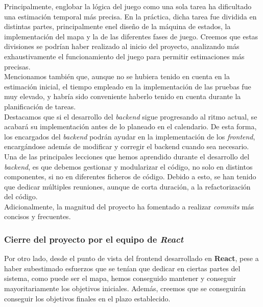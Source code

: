 \documentclass[11pt, a4paper, titlepage]{article}
\begin{document}
Principalmente, englobar la lógica del juego como una sola tarea ha dificultado una estimación temporal más precisa. En la práctica, dicha tarea fue dividida en distintas partes, principalmente enel diseño de la máquina de estados, la implementación del mapa y la de las diferentes fases de juego. Creemos que estas divisiones se podrían haber realizado al inicio del proyecto, analizando más exhaustivamente el funcionamiento del juego para permitir estimaciones más precisas. \\

Mencionamos también que, aunque no se hubiera tenido en cuenta en la estimación inicial, el tiempo empleado en la implementación de las pruebas fue muy elevado, y habría sido conveniente haberlo tenido en cuenta durante la planificación de tareas. \\

Destacamos que si el desarrollo del \textit{backend} sigue progresando al ritmo actual, se acabará su implementación antes de lo planeado en el calendario. De esta forma, los encargados del \textit{backend} podrán ayudar en la implementación de los \textit{frontend}, encargándose además de modificar y corregir el backend cuando sea necesario. \\

Una de las principales lecciones que hemos aprendido durante el desarrollo del \textit{backend}, es que debemos gestionar y modularizar el código, no solo en distintos componentes, si no en diferentes ficheros de código. Debido a esto, se han tenido que dedicar múltiples reuniones, aunque de corta duración, a la refactorización del código.\\

Adicionalmente, la magnitud del proyecto ha fomentado a realizar \textit{commits} más concisos y frecuentes. \\

\subsubsection{Cierre del proyecto por el equipo de \textit{React}}
Por otro lado, desde el punto de vista del frontend desarrollado en \textbf{React}, pese a haber subestimado esfuerzos que se tenían que dedicar en ciertas partes del sistema, como puede ser el mapa, hemos conseguido mantener y conseguir mayoritariamente los objetivos iniciales. Además, creemos que se conseguirán conseguir los objetivos finales en el plazo establecido. \\
\end{document}
